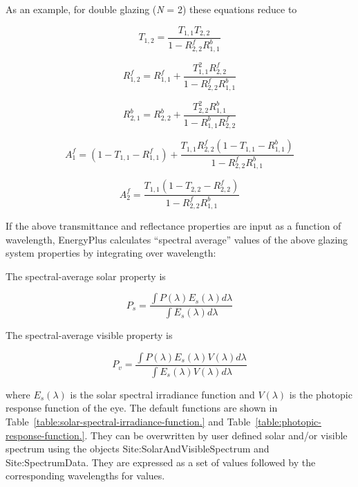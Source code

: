 As an example, for double glazing (\emph{N} = 2) these equations reduce to

\begin{equation}
{T_{1,2}} = \frac{{{T_{1,1}}{T_{2,2}}}}{{1 - R_{2,2}^fR_{1,1}^b}}
\end{equation}

\begin{equation}
R_{1,2}^f = R_{1,1}^f + \frac{{T_{1,1}^2R_{2,2}^f}}{{1 - R_{2,2}^fR_{1,1}^b}}
\end{equation}

\begin{equation}
R_{2,1}^b = R_{2,2}^b + \frac{{T_{2,2}^2R_{1,1}^b}}{{1 - R_{1,1}^bR_{2,2}^f}}
\end{equation}

\begin{equation}
A_1^f = (1 - {T_{1,1}} - R_{1,1}^f) + \frac{{{T_{1,1}}R_{2,2}^f(1 - {T_{1,1}} - R_{1,1}^b)}}{{1 - R_{2,2}^fR_{1,1}^b}}
\end{equation}

\begin{equation}
A_2^f = \frac{{{T_{1,1}}(1 - {T_{2,2}} - R_{2,2}^f)}}{{1 - R_{2,2}^fR_{1,1}^b}}
\end{equation}

If the above transmittance and reflectance properties are input as a function of wavelength, EnergyPlus calculates ``spectral average'' values of the above glazing system properties by integrating over wavelength:

The spectral-average solar property is

\begin{equation}
{P_s} = \frac{{\int {P(\lambda ){E_s}(\lambda )d\lambda } }}{{\int {{E_s}(\lambda )d\lambda } }}
\end{equation}

The spectral-average visible property is

\begin{equation}
{P_v} = \frac{{\int {P(\lambda ){E_s}(\lambda )V(\lambda )d\lambda } }}{{\int {{E_s}(\lambda )V(\lambda )d\lambda } }}
\end{equation}

where \({E_s}(\lambda )\) is the solar spectral irradiance function and \(V(\lambda )\) is the photopic response function of the eye. The default functions are shown in Table~\ref{table:solar-spectral-irradiance-function.} and Table~\ref{table:photopic-response-function.}. They can be overwritten by user defined solar and/or visible spectrum using the objects Site:SolarAndVisibleSpectrum and Site:SpectrumData. They are expressed as a set of values followed by the corresponding wavelengths for values.

